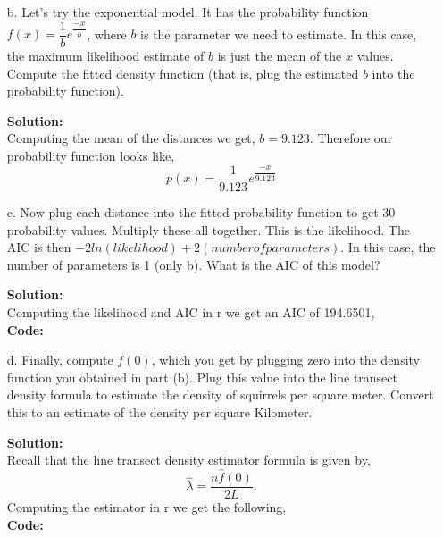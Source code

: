 \documentclass[12pt]{article}
\makeatletter
\theoremstyle{homework}
\newenvironment{exercise}[1]
{\def\@currentlabel{#1}\exercisecore}
{\endexercisecore}
\newcommand{\localhead}[1]{\par\smallskip\noindent\textbf{#1}\nobreak\\}%
\newcommand\solution{\localhead{Solution:}}
\makeatother
\begin{document}
\begin{exercise}{1}
\begin{enumerate}
    \vspace{.15in}



    \item[b.]  Let’s try the exponential model. It has the probability function $ f(x) = \dfrac{1}{b}e^{\dfrac{-x}{b}}$, where $b$ is the parameter we need to estimate. In this case, 
    the maximum likelihood estimate of $b$ is just the mean of the $x$ values. Compute the fitted density function (that is, plug the estimated $b$ into the probability function).\\
    \solution Computing the mean of the distances we get, $b =  9.123$. Therefore our probability function looks like, 
    \begin{equation*}
      p(x) = \dfrac{1}{9.123}e^{\dfrac{-x}{9.123}}
    \end{equation*}

    \vspace{.15in}


    \item[c.] Now plug each distance into the fitted probability function to get 30 probability values. 
    Multiply these all together. This is the likelihood. The AIC is then $-2ln(likelihood) + 2(number of parameters)$. 
    In this case, the number of parameters is 1 (only b). What is the AIC of this model?\\
    \solution Computing the likelihood and AIC in r we get an AIC of 194.6501, \\
    \textbf{Code:}
    \begin{center}
       
    \end{center}

    \vspace{.15in}

    \item[d.]  Finally, compute $f(0)$, which you get by plugging zero into the density function you obtained in part (b). 
    Plug this value into the line transect density formula to estimate the density of squirrels per square meter. 
    Convert this to an estimate of the density per square Kilometer.\\
    \solution Recall that the line transect density estimator formula is given by,
    \begin{equation*}
      \hat{\lambda} = \frac{n\hat{f}(0)}{2L}.
    \end{equation*}
    Computing the estimator in r we get the following, \\
    \textbf{Code:}
    \begin{center}
       
    \end{center}

  \end{enumerate}
\end{exercise}
\end{document}
